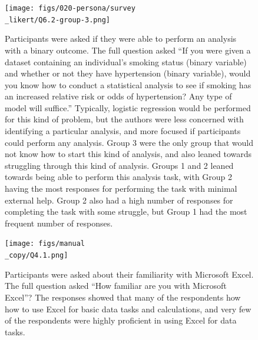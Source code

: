 \documentclass[020-persona\_validation.tex]{subfiles}
\begin{document}
    \begin{figure}[!hbtp]
        \centering
        \texttt{[image: figs/020-persona/survey\\\_likert/Q6.2-group-3.png]}
        \caption[Q6.2: Statistics question result for 3 clusters]
        {Participants were asked if they were able to perform an analysis with a binary outcome.
            The full question asked
            ``If you were given a dataset containing an individual's smoking status (binary variable)
            and whether or not they have hypertension (binary variable),
            would you know how to conduct a statistical analysis
            to see if smoking has an increased relative risk or odds of hypertension? Any type of model will suffice.''
            Typically, logistic regression would be performed for this kind of problem,
            but the authors were less concerned with identifying a particular analysis,
            and more focused if participants could perform any analysis.
            Group 3 were the only group that would not know how to start this kind of analysis,
            and also leaned towards struggling through this kind of analysis.
            Groups 1 and 2 leaned towards being able to perform this analysis task,
            with Group 2 having the most responses for performing the task with minimal external help.
            Group 2 also had a high number of responses for completing the task with some struggle,
            but Group 1 had the most frequent number of responses.
        }
        \label{sfig:cluster-q6-2}
    \end{figure}

    \begin{figure}[!hbtp]
        \centering
        \texttt{[image: figs/manual\\\_copy/Q4.1.png]}
        \caption[Q4.1: Excel proficiency across 3 clusters]
        {Participants were asked about their familiarity with Microsoft Excel.
            The full question asked
            ``How familiar are you with Microsoft Excel''?
            The responses showed that many of the respondents how how to use Excel for basic data tasks and calculations,
            and very few of the respondents were highly proficient in using Excel for data tasks.
        }
        \label{sfig:cluster-q4.1}
    \end{figure}
\end{document}
